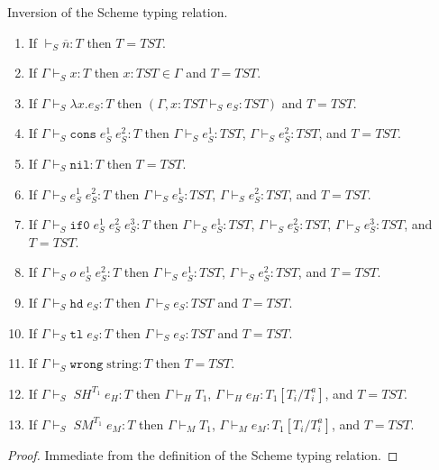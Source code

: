 \begin{si}
\label{si}
Inversion of the Scheme typing relation.
\begin{enumerate}
\item If $\vdash_{S}\overline{n}:T$ then $T=TST$.
\item If $\Gamma\vdash_{S}x:T$ then $x:TST\in\Gamma$ and $T=TST$.
\item If $\Gamma\vdash_{S}\lambda x.e_{S}:T$ then $(\Gamma,x:TST\vdash_{S}e_{S}:TST)$ and $T=TST$.
\item If $\Gamma\vdash_{S}\mathtt{cons}\;e_{S}^{1}\;e_{S}^{2}:T$ then $\Gamma\vdash_{S}e_{S}^{1}:TST$, $\Gamma\vdash_{S}e_{S}^{2}:TST$, and $T=TST$.
\item If $\Gamma\vdash_{S}\mathtt{nil}:T$ then $T=TST$.
\item If $\Gamma\vdash_{S}e_{S}^{1}\;e_{S}^{2}:T$ then $\Gamma\vdash_{S}e_{S}^{1}:TST$, $\Gamma\vdash_{S}e_{S}^{2}:TST$, and $T=TST$.
\item If $\Gamma\vdash_{S}\mathtt{if0}\;e_{S}^{1}\;e_{S}^{2}\;e_{S}^{3}:T$ then $\Gamma\vdash_{S}e_{S}^{1}:TST$, $\Gamma\vdash_{S}e_{S}^{2}:TST$, $\Gamma\vdash_{S}e_{S}^{3}:TST$, and $T=TST$.
\item If $\Gamma\vdash_{S}o\;e_{S}^{1}\;e_{S}^{2}:T$ then $\Gamma\vdash_{S}e_{S}^{1}:TST$, $\Gamma\vdash_{S}e_{S}^{2}:TST$, and $T=TST$.
\item If $\Gamma\vdash_{S}\mathtt{hd}\;e_{S}:T$ then $\Gamma\vdash_{S}e_{S}:TST$ and $T=TST$.
\item If $\Gamma\vdash_{S}\mathtt{tl}\;e_{S}:T$ then $\Gamma\vdash_{S}e_{S}:TST$ and $T=TST$.
\item If $\Gamma\vdash_{S}\mathtt{wrong}\;\mathrm{string}:T$ then $T=TST$.
\item If $\Gamma\vdash_{S}\;SH^{T_{1}}\;e_{H}:T$ then $\Gamma\vdash_{H}T_{1}$, $\Gamma\vdash_{H}e_{H}:T_{1}[T_{i}/T_{i}^{a}]$, and $T=TST$.
\item If $\Gamma\vdash_{S}\;SM^{T_{1}}\;e_{M}:T$ then $\Gamma\vdash_{M}T_{1}$, $\Gamma\vdash_{M}e_{M}:T_{1}[T_{i}/T_{i}^{a}]$, and $T=TST$.
\end{enumerate}
\begin{proof}
Immediate from the definition of the Scheme typing relation.
\end{proof}
\end{si}
